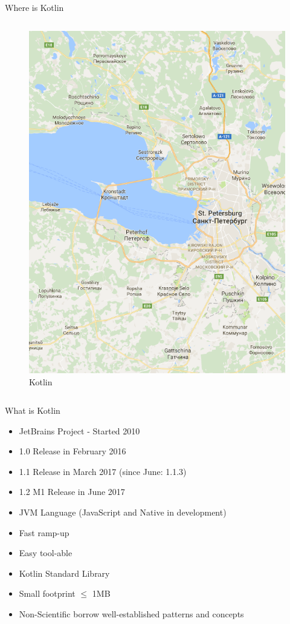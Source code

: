 \begin{frame}{Where is Kotlin}
\begin{columns}
\begin{column}{0.5\textwidth}
{\begin{figure}
					\includegraphics{figures/kotlin}
					\caption{Kotlin}
				\end{figure}
			}
		\end{column}
	\end{columns}
\end{frame}

\begin{frame}{What is Kotlin}
	\begin{itemize}
		\item JetBrains Project - Started 2010
		\item 1.0 Release in February 2016
		\item 1.1 Release in March 2017 (since June: 1.1.3)
		\item 1.2 M1 Release in June 2017
		\item JVM Language (JavaScript and Native in development)
		\item Fast ramp-up
		\item Easy tool-able
		\item Kotlin Standard Library
		\item Small footprint $\leq$ 1MB
		\item Non-Scientific borrow well-established patterns and concepts 
	\end{itemize}
\end{frame}

